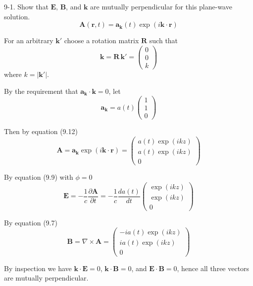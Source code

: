 \documentclass[12pt]{article}
\begin{document}
9-1.
Show that $\mathbf E$, $\mathbf B$, and $\mathbf k$ are
mutually perpendicular for this plane-wave solution.
\begin{equation*}
\mathbf A(\mathbf r,t)=\mathbf a_{\mathbf k}(t)
\exp(i\mathbf k\cdot\mathbf r)
\tag{9.12}
\end{equation*}

For an arbitrary $\mathbf k'$
choose a rotation matrix $\mathbf R$ such that
\begin{equation*}
\mathbf k=\mathbf R\,\mathbf k'=\begin{pmatrix}0\\0\\k\end{pmatrix}
\end{equation*}
where $k=|\mathbf k'|$.

\bigskip
By the requirement that $\mathbf a_{\mathbf k}\cdot\mathbf k=0$, let
\begin{equation*}
\mathbf a_{\mathbf k}=a(t)\begin{pmatrix}1\\1\\0\end{pmatrix}
\end{equation*}

Then by equation (9.12)
\begin{equation*}
\mathbf A=\mathbf a_{\mathbf k}\exp(i\mathbf k\cdot\mathbf r)
=\begin{pmatrix}
a(t)\exp(ikz)
\\[1ex]
a(t)\exp(ikz)
\\[1ex]
0
\end{pmatrix}
\end{equation*}

By equation (9.9) with $\phi=0$
\begin{equation*}
\mathbf E=-\frac{1}{c}\frac{\partial\mathbf A}{\partial t}=
-\frac{1}{c}\frac{da(t)}{dt}
\begin{pmatrix}
\exp(ikz)
\\[1ex]
\exp(ikz)
\\[1ex]
0
\end{pmatrix}
\end{equation*}

By equation (9.7)
\begin{equation*}
\mathbf B=\nabla\times\mathbf A=
\begin{pmatrix}
-ia(t)\exp(ikz)
\\[1ex]
ia(t)\exp(ikz)
\\[1ex]
0
\end{pmatrix}
\end{equation*}

By inspection we have $\mathbf k\cdot\mathbf E=0$, $\mathbf k\cdot\mathbf B=0$,
and $\mathbf E\cdot\mathbf B=0$, hence all three vectors are mutually perpendicular.
\end{document}
